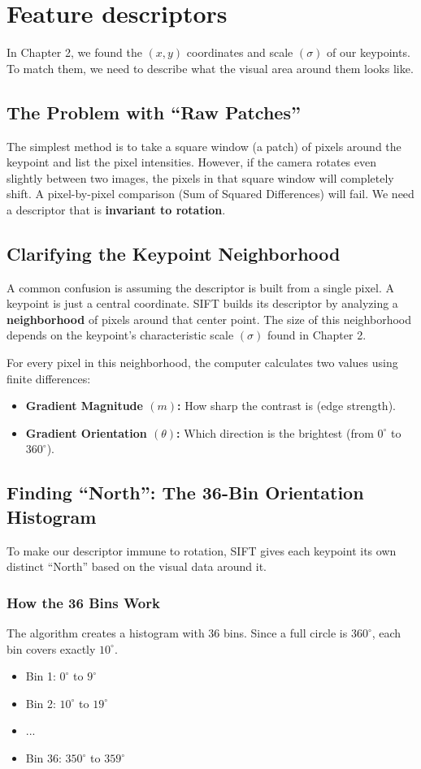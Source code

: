 \documentclass{report}
\begin{document}
\chapter{Feature descriptors}
In Chapter 2, we found the $(x, y)$ coordinates and scale $(\sigma)$ of our keypoints. To match them, we need to describe what the
visual area around them looks like.

\section{The Problem with ``Raw Patches''}
The simplest method is to take a square window (a patch) of pixels around the keypoint and list the pixel intensities. However, if the camera rotates even slightly between two images,
the pixels in that square window will completely shift. A pixel-by-pixel comparison (Sum of Squared Differences) will fail.
We need a descriptor that is \textbf{invariant to rotation}.

\section{Clarifying the Keypoint Neighborhood}
A common confusion is assuming the descriptor is built from a single pixel. A keypoint is just a central coordinate.
SIFT builds its descriptor by analyzing a \textbf{neighborhood} of pixels around that center point. The size of this neighborhood
depends on the keypoint's characteristic scale $(\sigma)$ found in Chapter 2.

For every pixel in this neighborhood, the computer calculates two values using finite differences:
\begin{itemize}
    \item \textbf{Gradient Magnitude $(m)$:} How sharp the contrast is (edge strength).
    \item \textbf{Gradient Orientation $(\theta)$:} Which direction is the brightest (from $0^\circ$ to $360^\circ$).
\end{itemize}

\section{Finding ``North'': The 36-Bin Orientation Histogram}
To make our descriptor immune to rotation, SIFT gives each keypoint its own distinct ``North'' based on the visual data around it.

\subsection{How the 36 Bins Work}
The algorithm creates a histogram with 36 bins. Since a full circle is $360^\circ$, each bin covers exactly $10^\circ$.
\begin{itemize}
    \item Bin 1: $0^\circ$ to $9^\circ$
    \item Bin 2: $10^\circ$ to $19^\circ$
    \item ...
    \item Bin 36: $350^\circ$ to $359^\circ$
\end{itemize}
\end{document}
